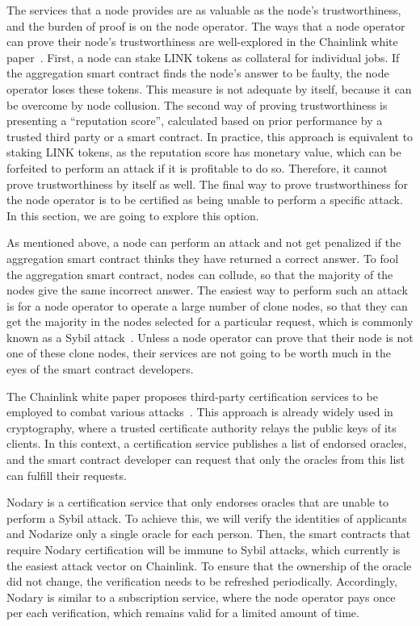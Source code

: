 \documentclass[12pt]{article}
\begin{document}
The services that a node provides are as valuable as the node’s trustworthiness, and the burden of proof is on the node operator.
The ways that a node operator can prove their node’s trustworthiness are well-explored in the Chainlink white paper~\cite{Ellis:2017}.
First, a node can stake LINK tokens as collateral for individual jobs.
If the aggregation smart contract finds the node’s answer to be faulty, the node operator loses these tokens.
This measure is not adequate by itself, because it can be overcome by node collusion.
The second way of proving trustworthiness is presenting a “reputation score”, calculated based on prior performance by a trusted third party or a smart contract.
In practice, this approach is equivalent to staking LINK tokens, as the reputation score has monetary value, which can be forfeited to perform an attack if it is profitable to do so.
Therefore, it cannot prove trustworthiness by itself as well.
The final way to prove trustworthiness for the node operator is to be certified as being unable to perform a specific attack.
In this section, we are going to explore this option.

As mentioned above, a node can perform an attack and not get penalized if the aggregation smart contract thinks they have returned a correct answer.
To fool the aggregation smart contract, nodes can collude, so that the majority of the nodes give the same incorrect answer.
The easiest way to perform such an attack is for a node operator to operate a large number of clone nodes, so that they can get the majority in the nodes selected for a particular request, which is commonly known as a Sybil attack~\cite{Douceur:2002}.
Unless a node operator can prove that their node is not one of these clone nodes, their services are not going to be worth much in the eyes of the smart contract developers.

The Chainlink white paper proposes third-party certification services to be employed to combat various attacks~\cite{Ellis:2017}.
This approach is already widely used in cryptography, where a trusted certificate authority relays the public keys of its clients.
In this context, a certification service publishes a list of endorsed oracles, and the smart contract developer can request that only the oracles from this list can fulfill their requests.

Nodary is a certification service that only endorses oracles that are unable to perform a Sybil attack.
To achieve this, we will verify the identities of applicants and Nodarize only a single oracle for each person.
Then, the smart contracts that require Nodary certification will be immune to Sybil attacks, which currently is the easiest attack vector on Chainlink.
To ensure that the ownership of the oracle did not change, the verification needs to be refreshed periodically.
Accordingly, Nodary is similar to a subscription service, where the node operator pays once per each verification, which remains valid for a limited amount of time.
\end{document}

